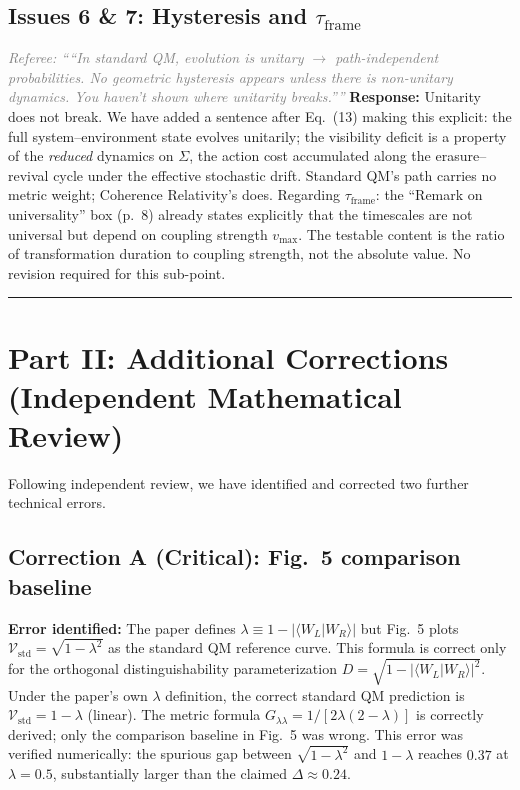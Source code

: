 \documentclass[12pt]{article}
\newcommand{\referee}[1]{\medskip\noindent\textcolor{gray}{\textit{Referee: ``#1''}}\medskip}
\newcommand{\response}[1]{\noindent\textbf{Response:} #1\medskip}
\begin{document}
\subsection*{Issues 6 \& 7: Hysteresis and $\tau_\mathrm{frame}$}
\referee{``In standard QM, evolution is unitary $\to$ path-independent probabilities.
No geometric hysteresis appears unless there is non-unitary dynamics. You haven't shown
where unitarity breaks.''}
\response{Unitarity does not break. We have added a sentence after Eq.~(13) making
this explicit: the full system--environment state evolves unitarily; the visibility
deficit is a property of the \emph{reduced} dynamics on $\Sigma$, the action cost
accumulated along the erasure--revival cycle under the effective stochastic drift.
Standard QM's path carries no metric weight; Coherence Relativity's does. Regarding
$\tau_\mathrm{frame}$: the ``Remark on universality'' box (p.~8) already states
explicitly that the timescales are not universal but depend on coupling strength
$v_\mathrm{max}$. The testable content is the ratio of transformation duration to
coupling strength, not the absolute value. No revision required for this sub-point.}

\bigskip\hrule\bigskip

\section*{Part II: Additional Corrections (Independent Mathematical Review)}

Following independent review, we have identified and corrected two further technical
errors.

\subsection*{Correction A (Critical): Fig.~5 comparison baseline}
\textbf{Error identified:} The paper defines $\lambda \equiv 1 - |\langle
W_L|W_R\rangle|$ but Fig.~5 plots $\mathcal{V}_\mathrm{std} = \sqrt{1-\lambda^2}$
as the standard QM reference curve. This formula is correct only for the orthogonal
distinguishability parameterization $D = \sqrt{1-|\langle W_L|W_R\rangle|^2}$.
Under the paper's own $\lambda$ definition, the correct standard QM prediction is
$\mathcal{V}_\mathrm{std} = 1 - \lambda$ (linear). The metric formula
$G_{\lambda\lambda} = 1/[2\lambda(2-\lambda)]$ is correctly derived; only the
comparison baseline in Fig.~5 was wrong. This error was verified numerically:
the spurious gap between $\sqrt{1-\lambda^2}$ and $1-\lambda$ reaches $0.37$ at
$\lambda = 0.5$, substantially larger than the claimed $\Delta \approx 0.24$.
\end{document}
